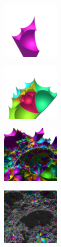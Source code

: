 \documentclass[suppldata, dvipdfmx]{interact}
\theoremstyle{plain}%
\theoremstyle{definition}
\theoremstyle{remark}
\theoremstyle{problemstyle}
\begin{document}
\begin{figure}[h!tbp]
 \begin{minipage}[t]{0.18\textwidth}
  \centering
  \includegraphics[height=1.1in, keepaspectratio]{./img/constructFractal/terrainProcess/step1.png}
  \label{fig:terrainStep1}
 \end{minipage}
 \hspace*{\fill}
 \begin{minipage}[t]{0.18\textwidth}
  \centering
  \includegraphics[height=1.1in, keepaspectratio]{./img/constructFractal/terrainProcess/step2.png}
  \label{}
 \end{minipage}
 \hspace*{\fill}
 \begin{minipage}[t]{0.18\textwidth}
  \centering
  \includegraphics[height=1.1in, keepaspectratio]{./img/constructFractal/terrainProcess/step5.png}
  \label{}
 \end{minipage}
 \hspace*{\fill}
 \begin{minipage}[t]{0.18\textwidth}
  \centering
  \includegraphics[height=1.1in, keepaspectratio]{./img/constructFractal/terrainProcess/step10.jpg}
  \label{fig:terrainStep10}
 \end{minipage}

\end{figure}
\end{document}
